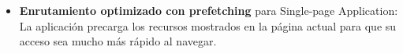 \documentclass[12pt,twoside,titlepage]{report}
\begin{document}
\begin{itemize}

    \item \textbf{Enrutamiento optimizado con prefetching} para Single-page Application: La aplicación precarga los recursos mostrados en la página actual para que su acceso sea mucho más rápido al navegar. 

\end{itemize}
\end{document}
